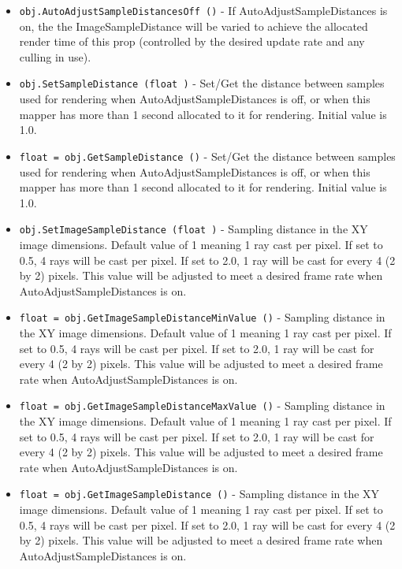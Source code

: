 \begin{itemize}
\item  \verb|obj.AutoAdjustSampleDistancesOff ()| -  If AutoAdjustSampleDistances is on, the the ImageSampleDistance
 will be varied to achieve the allocated render time of this
 prop (controlled by the desired update rate and any culling in
 use).

\item  \verb|obj.SetSampleDistance (float )| -  Set/Get the distance between samples used for rendering
 when AutoAdjustSampleDistances is off, or when this mapper
 has more than 1 second allocated to it for rendering.
 Initial value is 1.0.

\item  \verb|float = obj.GetSampleDistance ()| -  Set/Get the distance between samples used for rendering
 when AutoAdjustSampleDistances is off, or when this mapper
 has more than 1 second allocated to it for rendering.
 Initial value is 1.0.

\item  \verb|obj.SetImageSampleDistance (float )| -  Sampling distance in the XY image dimensions. Default value of 1 meaning
 1 ray cast per pixel. If set to 0.5, 4 rays will be cast per pixel. If
 set to 2.0, 1 ray will be cast for every 4 (2 by 2) pixels. This value
 will be adjusted to meet a desired frame rate when AutoAdjustSampleDistances
 is on.

\item  \verb|float = obj.GetImageSampleDistanceMinValue ()| -  Sampling distance in the XY image dimensions. Default value of 1 meaning
 1 ray cast per pixel. If set to 0.5, 4 rays will be cast per pixel. If
 set to 2.0, 1 ray will be cast for every 4 (2 by 2) pixels. This value
 will be adjusted to meet a desired frame rate when AutoAdjustSampleDistances
 is on.

\item  \verb|float = obj.GetImageSampleDistanceMaxValue ()| -  Sampling distance in the XY image dimensions. Default value of 1 meaning
 1 ray cast per pixel. If set to 0.5, 4 rays will be cast per pixel. If
 set to 2.0, 1 ray will be cast for every 4 (2 by 2) pixels. This value
 will be adjusted to meet a desired frame rate when AutoAdjustSampleDistances
 is on.

\item  \verb|float = obj.GetImageSampleDistance ()| -  Sampling distance in the XY image dimensions. Default value of 1 meaning
 1 ray cast per pixel. If set to 0.5, 4 rays will be cast per pixel. If
 set to 2.0, 1 ray will be cast for every 4 (2 by 2) pixels. This value
 will be adjusted to meet a desired frame rate when AutoAdjustSampleDistances
 is on.


\end{itemize}
